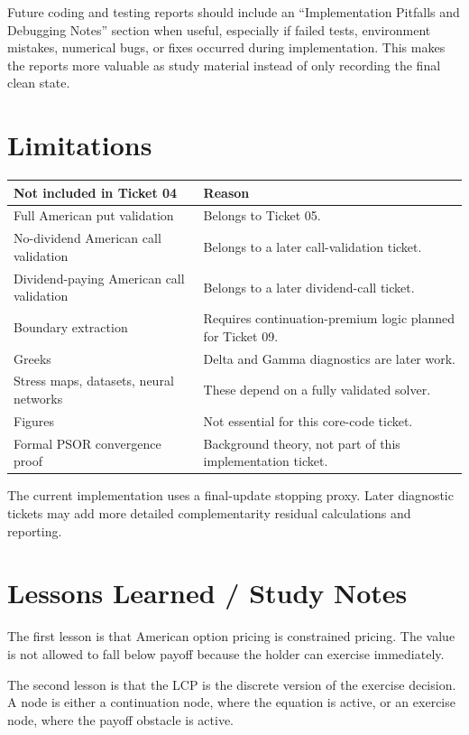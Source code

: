 \documentclass[11pt,a4paper]{article}
\begin{document}
Future coding and testing reports should include an ``Implementation Pitfalls and Debugging
Notes'' section when useful, especially if failed tests, environment mistakes, numerical bugs, or
fixes occurred during implementation. This makes the reports more valuable as study material
instead of only recording the final clean state.

\section{Limitations}

\begin{longtable}{L{0.34\textwidth}L{0.54\textwidth}}
\toprule
Not included in Ticket 04 & Reason \\
\midrule
\endhead
Full American put validation & Belongs to Ticket 05. \\
No-dividend American call validation & Belongs to a later call-validation ticket. \\
Dividend-paying American call validation & Belongs to a later dividend-call ticket. \\
Boundary extraction & Requires continuation-premium logic planned for Ticket 09. \\
Greeks & Delta and Gamma diagnostics are later work. \\
Stress maps, datasets, neural networks & These depend on a fully validated solver. \\
Figures & Not essential for this core-code ticket. \\
Formal PSOR convergence proof & Background theory, not part of this implementation ticket. \\
\bottomrule
\end{longtable}

The current implementation uses a final-update stopping proxy. Later diagnostic tickets may add
more detailed complementarity residual calculations and reporting.

\section{Lessons Learned / Study Notes}

The first lesson is that American option pricing is constrained pricing. The value is not allowed
to fall below payoff because the holder can exercise immediately.

The second lesson is that the LCP is the discrete version of the exercise decision. A node is
either a continuation node, where the equation is active, or an exercise node, where the payoff
obstacle is active.
\end{document}
